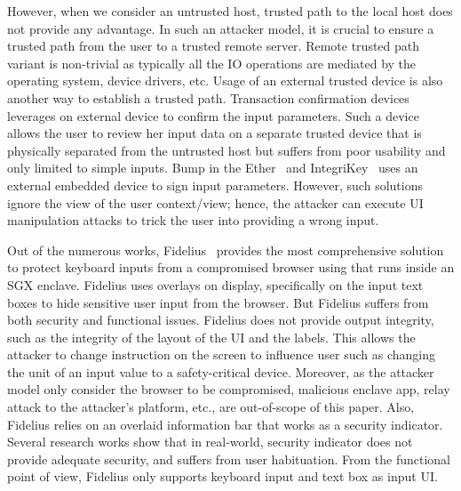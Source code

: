However, when we consider an untrusted host, trusted path to the local host does not provide any advantage. In such an attacker model, it is crucial to ensure a trusted path from the user to a trusted remote server. Remote trusted path variant is non-trivial as typically all the IO operations are mediated by the operating system, device drivers, etc. Usage of an external trusted device is also another way to establish a trusted path. Transaction confirmation devices~\cite{filyanov2011uni,weigold2011secure} leverages on external device to confirm the input parameters. Such a device allows the user to review her input data on a separate trusted device that is physically separated from the untrusted host but suffers from poor usability and only limited to simple inputs. Bump in the Ether~\cite{McCPerRei2006} and IntegriKey~\cite{IntegriKey} uses an external embedded device to sign input parameters. However, such solutions ignore the view of the user context/view; hence, the attacker can execute UI manipulation attacks to trick the user into providing a wrong input.

Out of the numerous works, Fidelius~\cite{Fidelius} provides the most comprehensive solution to protect keyboard inputs from a compromised browser using \js that runs inside an SGX enclave. Fidelius uses overlays on display, specifically on the input text boxes to hide sensitive user input from the browser. But Fidelius suffers from both security and functional issues. Fidelius does not provide output integrity, such as the integrity of the layout of the UI and the labels. This allows the attacker to change instruction on the screen to influence user such as changing the unit of an input value to a safety-critical device. Moreover, as the attacker model only consider the browser to be compromised, malicious enclave app, relay attack to the attacker's platform, etc., are out-of-scope of this paper. Also, Fidelius relies on an overlaid information bar that works as a security indicator. Several research works show that in real-world, security indicator does not provide adequate security, and suffers from user habituation. From the functional point of view, Fidelius only supports keyboard input and text box as input UI.
 
